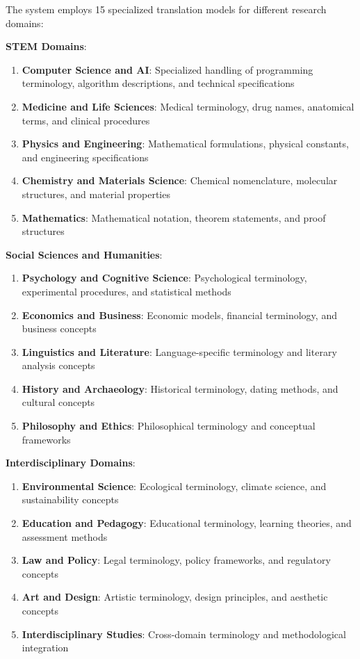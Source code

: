 \documentclass[10pt,twocolumn]{article}
\begin{document}
The system employs 15 specialized translation models for different research domains:

\textbf{STEM Domains}:
\begin{enumerate}
    \item \textbf{Computer Science and AI}: Specialized handling of programming terminology, algorithm descriptions, and technical specifications
    \item \textbf{Medicine and Life Sciences}: Medical terminology, drug names, anatomical terms, and clinical procedures
    \item \textbf{Physics and Engineering}: Mathematical formulations, physical constants, and engineering specifications
    \item \textbf{Chemistry and Materials Science}: Chemical nomenclature, molecular structures, and material properties
    \item \textbf{Mathematics}: Mathematical notation, theorem statements, and proof structures
\end{enumerate}

\textbf{Social Sciences and Humanities}:
\begin{enumerate}
    \item \textbf{Psychology and Cognitive Science}: Psychological terminology, experimental procedures, and statistical methods
    \item \textbf{Economics and Business}: Economic models, financial terminology, and business concepts
    \item \textbf{Linguistics and Literature}: Language-specific terminology and literary analysis concepts
    \item \textbf{History and Archaeology}: Historical terminology, dating methods, and cultural concepts
    \item \textbf{Philosophy and Ethics}: Philosophical terminology and conceptual frameworks
\end{enumerate}

\textbf{Interdisciplinary Domains}:
\begin{enumerate}
    \item \textbf{Environmental Science}: Ecological terminology, climate science, and sustainability concepts
    \item \textbf{Education and Pedagogy}: Educational terminology, learning theories, and assessment methods
    \item \textbf{Law and Policy}: Legal terminology, policy frameworks, and regulatory concepts
    \item \textbf{Art and Design}: Artistic terminology, design principles, and aesthetic concepts
    \item \textbf{Interdisciplinary Studies}: Cross-domain terminology and methodological integration
\end{enumerate}
\end{document}
